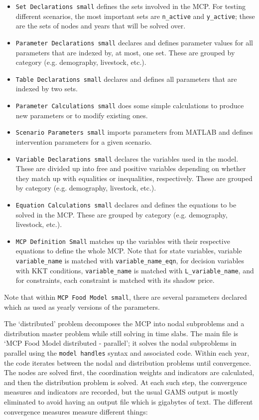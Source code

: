 \documentclass[letter,12pt]{article}
\begin{document}
\begin{itemize}
\item \verb!Set Declarations small! defines the sets involved in the MCP.  For testing different scenarios, the most important sets are \verb!n_active! and \verb!y_active!; these are the sets of nodes and years that will be solved over.
\item \verb!Parameter Declarations small! declares and defines parameter values for all parameters that are indexed by, at most, one set.  These are grouped by category (e.g. demography, livestock, etc.).
\item \verb!Table Declarations small! declares and defines all parameters that are indexed by two sets.
\item \verb!Parameter Calculations small! does some simple calculations to produce new parameters or to modify existing ones.
\item \verb!Scenario Parameters small! imports parameters from MATLAB and defines intervention parameters for a given scenario.
\item \verb!Variable Declarations small! declares the variables used in the model.  These are divided up into free and positive variables depending on whether they match up with equalities or inequalities, respectively.  These are grouped by category (e.g. demography, livestock, etc.).
\item \verb!Equation Calculations small! declares and defines the equations to be solved in the MCP.  These are grouped by category (e.g. demography, livestock, etc.).
\item \verb!MCP Definition Small! matches up the variables with their respective equations to define the whole MCP.  Note that for state variables, variable \verb!variable_name! is matched with \verb!variable_name_eqn!, for decision variables with KKT conditions, \verb!variable_name! is matched with \verb!L_variable_name!, and for constraints, each constraint is matched with its shadow price.
\end{itemize}

Note that within \verb!MCP Food Model small!, there are several parameters declared which as used as yearly versions of the parameters. 

The `distributed' problem decomposes the MCP into nodal subproblems and a distribution master problem while still solving in time slabs.  The main file is `MCP Food Model distributed - parallel'; it solves the nodal subproblems in parallel using the \verb!model handles! syntax and associated code.  Within each year, the code iterates between the nodal and distribution problems until convergence.  The nodes are solved first, the coordination weights and indicators are calculated, and then the distribution problem is solved.  At each such step, the convergence measures and indicators are recorded, but the usual GAMS output is mostly eliminated to avoid having an output file which is gigabytes of text.  The different convergence measures measure different things:
\end{document}
